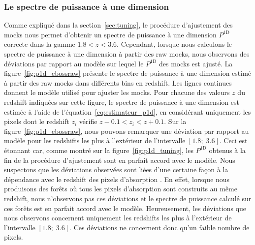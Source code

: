 


\subsubsection{Le spectre de puissance à une dimension}

Comme expliqué dans la section~\ref{sec:tuning}, le procédure d'ajustement des mocks nous permet d'obtenir un spectre de puissance à une dimension $P^{\mathrm{1D}}$ correcte dans la gamme $\num{1.8} < z < \num{3.6}$.
Cependant, lorsque nous calculons le spectre de puissance à une dimension à partir des raw mocks, nous observons des déviations par rapport au modèle sur lequel le $P^{\mathrm{1D}}$ des mocks est ajusté.
La figure~\ref{fig:p1d_ebossraw} présente le spectre de puissance à une dimension estimé à partir des raw mocks dans différents bins en redshift. Les lignes continues donnent le modèle utilisé pour ajuster les mocks. Pour chacune des valeurs $z$ du redshift indiquées sur cette figure, le spectre de puissance à une dimension est estimée à l'aide de l'équation~\ref{eq:estimateur_p1d}, en considérant uniquement les pixels dont le redshift $z_i$ vérifie $z - \num{0.1} < z_i < z + \num{0.1}$.
Sur la figure~\ref{fig:p1d_ebossraw}, nous pouvons remarquer une déviation par rapport au modèle pour les redshifts les plus à l'extérieur de l'intervalle $[\num{1.8};\;\num{3.6}]$.
Ceci est étonnant car, comme montré sur la figure~\ref{fig:p1d_tuning}, les $P^{\mathrm{1D}}$ obtenus à la fin de la procédure d'ajustement sont en parfait accord avec le modèle.
Nous suspectons que les déviations observées sont liées d'une certaine façon à la dépendance avec le redshift des pixels d'absorption \lya{}. En effet, lorsque nous produisons des forêts où tous les pixels d'absorption sont construits au même redshift, nous n'observons pas ces déviations et le spectre de puissance calculé sur ces forêts est en parfait accord avec le modèle.
Heureusement, les déviations que nous observons concernent uniquement les redshifts les plus à l'extérieur de l'intervalle $[\num{1.8};\;\num{3.6}]$. Ces déviations ne concernent donc qu'un faible nombre de pixels.

